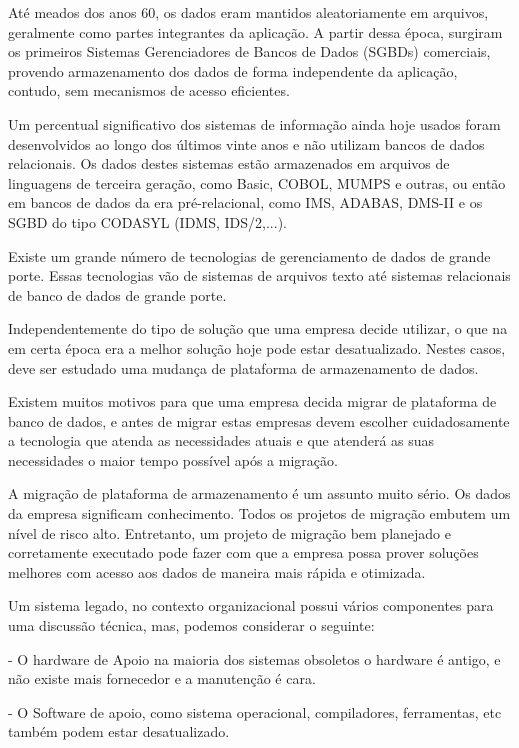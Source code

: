 Até meados dos anos 60, os dados eram mantidos aleatoriamente em arquivos, geralmente como partes integrantes da aplicação. A partir dessa época, surgiram os primeiros Sistemas Gerenciadores de Bancos de Dados (SGBDs) comerciais, provendo armazenamento dos dados de forma independente da aplicação, contudo, sem mecanismos de acesso eficientes. \cite{boscarioli2006} 

Um percentual significativo dos sistemas de informação ainda hoje usados foram desenvolvidos ao longo dos últimos vinte anos e não utilizam bancos de dados relacionais. Os dados destes sistemas estão armazenados em arquivos de linguagens de terceira geração, como Basic, COBOL, MUMPS e outras, ou então em bancos de dados da era pré-relacional, como IMS, ADABAS, DMS-II e os SGBD do tipo CODASYL (IDMS, IDS/2,...). \cite{heuser2001projeto}

Existe um grande número de tecnologias de gerenciamento de dados de grande porte. Essas tecnologias vão de sistemas de arquivos texto até sistemas relacionais de banco de dados de grande porte. 

Independentemente do tipo de solução que uma empresa decide utilizar, o que na em certa época era a melhor solução hoje pode estar desatualizado. Nestes casos, deve ser estudado uma mudança de plataforma de armazenamento de dados. 

Existem muitos motivos para que uma empresa decida migrar de plataforma de banco de dados, e antes de migrar estas empresas devem escolher cuidadosamente a tecnologia que atenda as necessidades atuais e que atenderá as suas necessidades o maior tempo possível após a migração. 

A migração de plataforma de armazenamento é um assunto muito sério. Os dados da empresa significam conhecimento. Todos os projetos de migração embutem um nível de risco alto. Entretanto, um projeto de migração bem planejado e corretamente executado pode fazer com que a empresa possa prover soluções melhores com acesso aos dados de maneira mais rápida e otimizada.

Um sistema legado, no contexto organizacional possui vários componentes para uma discussão técnica, mas, podemos considerar o seguinte: 

- O hardware de Apoio na maioria dos sistemas obsoletos o hardware é antigo, e não existe mais fornecedor e a manutenção é cara.

- O Software de apoio, como sistema operacional, compiladores, ferramentas, etc também podem estar desatualizado. 

